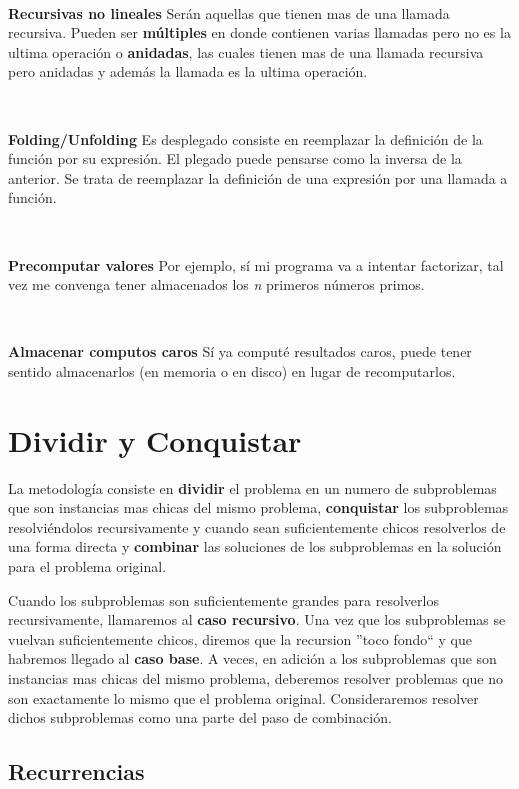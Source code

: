 ~

\textbf{Recursivas no lineales} Ser\'an aquellas que tienen mas de una llamada recursiva. Pueden ser \textbf{m\'ultiples} en donde contienen varias llamadas pero no es la ultima operaci\'on o \textbf{anidadas}, las cuales tienen mas de una llamada recursiva pero anidadas y adem\'as la llamada es la ultima operaci\'on.

~

\textbf{Folding/Unfolding} Es desplegado consiste en reemplazar la definici\'on de la funci\'on por su expresi\'on. El plegado puede pensarse como la inversa de la anterior. Se trata de reemplazar la definici\'on de una expresi\'on por una llamada a funci\'on.

~

\textbf{Precomputar valores} Por ejemplo, s\'i mi programa va a intentar factorizar, tal vez me convenga tener almacenados los \textit{n} primeros n\'umeros primos.

~

\textbf{Almacenar computos caros} S\'i ya comput\'e resultados caros, puede tener sentido almacenarlos (en memoria o en disco) en lugar de recomputarlos.

\newpage
\section{Dividir y Conquistar}

La metodolog\'ia consiste en \textbf{dividir} el problema en un numero de subproblemas que son instancias mas chicas del mismo problema, \textbf{conquistar} los subproblemas resolvi\'endolos recursivamente y cuando sean suficientemente chicos resolverlos de una forma directa y \textbf{combinar} las soluciones de los subproblemas en la soluci\'on para el problema original.

Cuando los subproblemas son suficientemente grandes para resolverlos recursivamente, llamaremos al \textbf{caso recursivo}. Una vez que los subproblemas se vuelvan suficientemente chicos, diremos que la recursion ''toco fondo`` y que habremos llegado al \textbf{caso base}. A veces, en adici\'on a los subproblemas que son instancias mas chicas del mismo problema, deberemos resolver problemas que no son exactamente lo mismo que el problema original. Consideraremos resolver dichos subproblemas como una parte del paso de combinaci\'on.

\subsection{Recurrencias}

